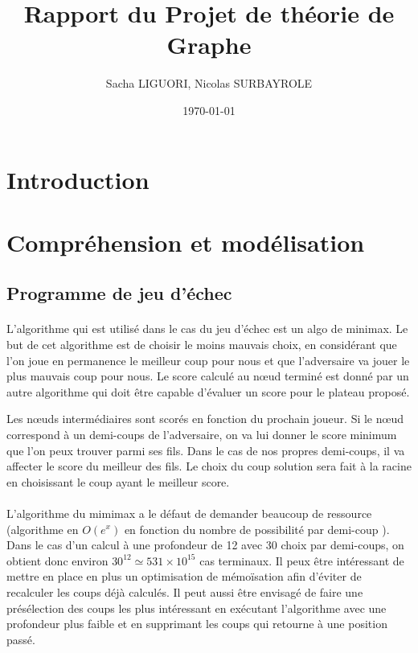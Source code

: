 \documentclass[11pt]{article}
\author{Sacha LIGUORI, Nicolas SURBAYROLE}
\title{Rapport du Projet de théorie de Graphe}
\date{\today}
\begin{document}
\maketitle

\tableofcontents

\newpage

\section{Introduction}


\section{Compréhension et modélisation}

\subsection{Programme de jeu d'échec}

\paragraph{}
L'algorithme qui est utilisé dans le cas du jeu d'échec est un algo de minimax. Le but de cet algorithme est de choisir le moins mauvais choix, en considérant que l'on joue en permanence le meilleur coup pour nous et que l'adversaire va jouer le plus mauvais coup pour nous. Le score calculé au n\oe ud terminé est donné par un autre algorithme qui doit être capable d'évaluer un score pour le plateau proposé.

Les n\oe uds intermédiaires sont scorés en fonction du prochain joueur. Si le n\oe ud correspond à un demi-coups de l'adversaire, on va lui donner le score minimum que l'on peux trouver parmi ses fils. Dans le cas de nos propres demi-coups, il va affecter le score du meilleur des fils. Le choix du coup solution sera fait à la racine en choisissant le coup ayant le meilleur score.

\paragraph{}

L'algorithme du mimimax a le défaut de demander beaucoup de ressource (algorithme en $O(e^{x})$ en fonction du nombre de possibilité par demi-coup ). Dans le cas d'un calcul à une profondeur de 12 avec 30 choix par demi-coups, on obtient donc environ $30^{12} \simeq 531 \times 10^{15}$ cas terminaux. Il peux être intéressant de mettre en place en plus un optimisation de mémoïsation afin d'éviter de recalculer les coups déjà calculés. Il peut aussi être envisagé de faire une présélection des coups les plus intéressant en exécutant l'algorithme avec une profondeur plus faible et en supprimant les coups qui retourne à une position passé.
\end{document}
